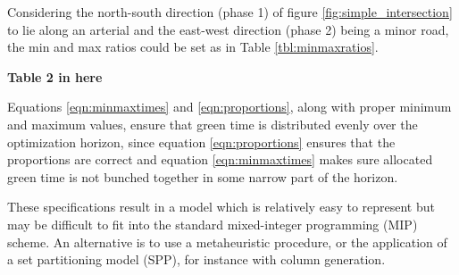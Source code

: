 Considering the north-south direction (phase 1) of figure
\ref{fig:simple_intersection} to lie along an arterial and the
east-west direction (phase 2) being a minor road, the min and max
ratios could be set as in Table \ref{tbl:minmaxratios}.

\begin{center}
{\bf Table 2 in here}
\end{center}

Equations \ref{eqn:minmaxtimes} and \ref{eqn:proportions},
along with proper minimum and maximum values, ensure that green time
is distributed evenly over the optimization horizon, since equation 
\ref{eqn:proportions} ensures that the proportions are correct and equation
\ref{eqn:minmaxtimes} makes sure allocated green time is not bunched
together in some narrow part of the horizon.

These specifications result in a model which is relatively easy to
represent but may be difficult to fit into the standard mixed-integer
programming (MIP) scheme. An alternative is to use a metaheuristic
procedure, or the application of a set partitioning model (SPP), for
instance with column generation.
